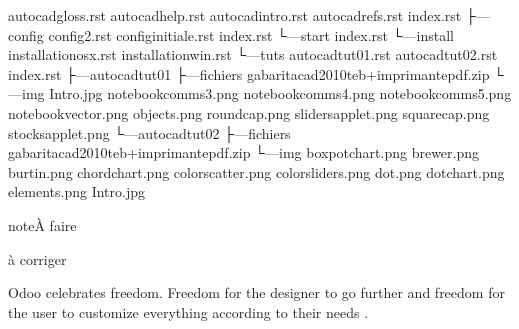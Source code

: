 \documentclass[a4paper,10pt,french]{sphinxmanual}
\begin{document}
\begin{sphinxVerbatim}[commandchars=\\\{\}]
\textbar{}   \textbar{}   autocad\PYGZhy{}gloss.rst
\textbar{}   \textbar{}   autocad\PYGZhy{}help.rst
\textbar{}   \textbar{}   autocad\PYGZhy{}intro.rst
\textbar{}   \textbar{}   autocad\PYGZhy{}refs.rst
\textbar{}   \textbar{}   index.rst
\textbar{}   \textbar{}
\textbar{}   ├---config
\textbar{}   \textbar{}       config\PYGZhy{}2.rst
\textbar{}   \textbar{}       config\PYGZhy{}initiale.rst
\textbar{}   \textbar{}       index.rst
\textbar{}   \textbar{}
\textbar{}   └---start
\textbar{}       \textbar{}   index.rst
\textbar{}       \textbar{}
\textbar{}       └---install
\textbar{}               installation\PYGZhy{}osx.rst
\textbar{}               installation\PYGZhy{}win.rst
\textbar{}
└---tuts
    \textbar{}   autocad\PYGZhy{}tut01.rst
    \textbar{}   autocad\PYGZhy{}tut02.rst
    \textbar{}   index.rst
    \textbar{}
    ├---autocad\PYGZhy{}tut01
    \textbar{}   ├---fichiers
    \textbar{}   \textbar{}       gabarit\PYGZus{}acad2010\PYGZus{}teb+imprimante\PYGZus{}pdf.zip
    \textbar{}   \textbar{}
    \textbar{}   └---img
    \textbar{}           Intro.jpg
    \textbar{}           notebook\PYGZus{}comms3.png
    \textbar{}           notebook\PYGZus{}comms4.png
    \textbar{}           notebook\PYGZus{}comms5.png
    \textbar{}           notebook\PYGZus{}vector.png
    \textbar{}           objects.png
    \textbar{}           round\PYGZus{}cap.png
    \textbar{}           sliders\PYGZus{}applet.png
    \textbar{}           square\PYGZus{}cap.png
    \textbar{}           stocks\PYGZus{}applet.png
    \textbar{}
    └---autocad\PYGZhy{}tut02
        ├---fichiers
        \textbar{}       gabarit\PYGZus{}acad2010\PYGZus{}teb+imprimante\PYGZus{}pdf.zip
        \textbar{}
        └---img
                boxpot\PYGZus{}chart.png
                brewer.png
                burtin.png
                chord\PYGZus{}chart.png
                color\PYGZus{}scatter.png
                color\PYGZus{}sliders.png
                dot.png
                dot\PYGZus{}chart.png
                elements.png
                Intro.jpg
\end{sphinxVerbatim}

\begin{sphinxadmonition}{note}{À faire}

à corriger
\end{sphinxadmonition}

Odoo celebrates freedom. Freedom for the designer to go further and
freedom for the user to customize everything according to their needs .
\end{document}
